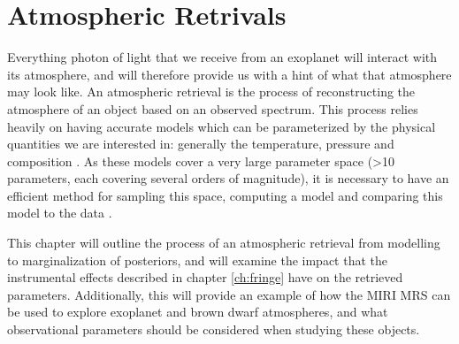 \chapter{Atmospheric Retrivals}
Everything photon of light that we receive from an exoplanet will interact with its atmosphere, and will therefore provide us with a hint of what that atmosphere may look like.
An atmospheric retrieval is the process of reconstructing the atmosphere of an object based on an observed spectrum.
This process relies heavily on having accurate models which can be parameterized by the physical quantities we are interested in: generally the temperature, pressure and composition \parencite{Madhusudhan2018}.
As these models cover a very large parameter space (>10 parameters, each covering several orders of magnitude), it is necessary to have an efficient method for sampling this space, computing a model and comparing this model to the data 
\parencite{Benneke2012}.

This chapter will outline the process of an atmospheric retrieval from modelling to marginalization of posteriors, and will examine the impact that the instrumental effects described in chapter \ref{ch:fringe} have on the retrieved parameters. 
Additionally, this will provide an example of how the MIRI MRS can be used to explore exoplanet and brown dwarf atmospheres, and what observational parameters should be considered when studying these objects.

\cite{Schlawin2018} %
\cite{Fisher2019} %
\cite{Oreshenko2019}%
\cite{Barman2015} %
\cite{Benneke2013} %
\cite{Benneke2012} %
\cite{Blanco-Cuaresma2018} %
\cite{Konopacky2013} %

\parencite{Morley2018} %
\cite{Lupu2016} %
\cite{Gandhi2018} %
\cite{Baudino2017} %
\cite{Line2013} %
\cite{Madhusudhan2018b} %
\cite{Irwin2008} %
\cite{Robinson2016} %
\cite{Waldmann2015} %
\cite{Waldmann2015a} %
\cite{Line2015,Line2017,Zalesky2019} %

